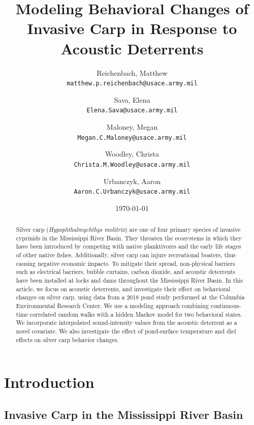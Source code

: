 \documentclass[12pt]{article}
\begin{document}
\begin{abstract}
	Silver carp (\emph{Hypophthalmychthys molitrix}) are one of four primary species of invasive cyprinids in the Mississippi River Basin. They threaten the ecosystems in which they have been introduced by competing with native planktivores and the early life stages of other native fishes. Additionally, silver carp can injure recreational boaters, thus causing negative economic impacts. To mitigate their spread, non-physical barriers such as electrical barriers, bubble curtains, carbon dioxide, and acoustic deterrents have been installed at locks and dams throughout the Mississippi River Basin. In this article, we focus on acoustic deterrents, and investigate their effect on behavioral changes on silver carp, using data from a 2018 pond study performed at the Columbia Environmental Research Center. We use a modeling approach combining continuous-time correlated random walks with a hidden Markov model for two behavioral states. We incorporate interpolated sound-intensity values from the acoustic deterrent as a novel covariate. We also investigate the effect of pond-surface temperature and diel effects on silver carp behavior changes.
\end{abstract}

\title{Modeling Behavioral Changes of Invasive Carp in Response to Acoustic Deterrents}
\author{
	Reichenbach, Matthew \\
	\texttt{matthew.p.reichenbach@usace.army.mil}
	\and
	Sava, Elena \\
	\texttt{Elena.Sava@usace.army.mil}
	\and
	Maloney, Megan \\
	\texttt{Megan.C.Maloney@usace.army.mil}
	\and
	Woodley, Christa \\
	\texttt{Christa.M.Woodley@usace.army.mil}
	\and
	Urbanczyk, Aaron \\
	\texttt{Aaron.C.Urbanczyk@usace.army.mil}
}
\date{\today}

\maketitle

\section{Introduction}

	\subsection{Invasive Carp in the Mississippi River Basin}
\end{document}
